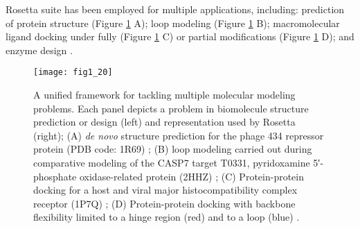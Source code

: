 \begin{refsection}
Rosetta suite has been employed for multiple applications, including:
prediction of protein structure \cite{Rohl2004} (Figure
\ref{fig:rosetta-overview} A); loop modeling \cite{Das2007a} (Figure
\ref{fig:rosetta-overview} B); macromolecular ligand docking under fully
\cite{Das2008} (Figure \ref{fig:rosetta-overview} C) or partial  modifications
\cite{Willcox2003} (Figure \ref{fig:rosetta-overview} D); and enzyme design
\cite{Ashworth2006a}.
\begin{figure}[htbp] \centering \texttt{[image: fig1\_20]}
    \caption[A unified framework for tackling multiple molecular modeling
        problems. Each panel depicts a problem in biomolecule structure
        prediction or design (left) and the representation used by Rosetta
        (right); (A) \emph{de novo} structure prediction for the phage 434
        repressor protein (PDB code: 1R69); (B) loop modeling carried out
        during comparative modeling of the CASP7 target T0331, pyridoxamine
        5′-phosphate oxidase-related protein (2HHZ); (C) Protein-protein
        docking for a host and viral major histocompatibility complex receptor
        (1P7Q); (D) Protein-protein docking with backbone flexibility limited
        to a hinge region (red) and to a loop (blue).] {A unified framework for
            tackling multiple molecular modeling problems. Each panel depicts a
            problem in biomolecule structure prediction or design (left) and
            representation used by Rosetta (right); (A) \emph{de novo}
            structure prediction for the phage 434 repressor protein (PDB code:
            1R69) \cite{Mondragon1989}; (B) loop modeling carried out during
            comparative modeling of the CASP7 target T0331, pyridoxamine
            5′-phosphate oxidase-related protein (2HHZ) \cite{Das2007a}; (C)
            Protein-protein docking for a host and viral major
            histocompatibility complex receptor (1P7Q) \cite{Willcox2003}; (D)
            Protein-protein docking with backbone flexibility limited to a
            hinge region (red) and to a loop (blue) \cite{Das2008}.}
        \label{fig:rosetta-overview} 
\end{figure}


\end{refsection}
